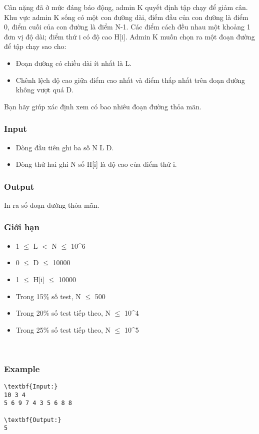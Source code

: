 

Cân nặng đã ở mức đáng báo động, admin K quyết định tập chạy để giảm cân. Khu vực admin K sống có một con đường dài, điểm đầu của con đường là điểm 0, điểm cuối của con đường là điểm N-1. Các điểm cách đều nhau một khoảng 1 đơn vị độ dài; điểm thứ i có độ cao H[i]. Admin K muốn chọn ra một đoạn đường để tập chạy sao cho:
\begin{itemize}
	\item Đoạn đường có chiều dài ít nhất là L.
	\item Chênh lệch độ cao giữa điểm cao nhất và điểm thấp nhất trên đoạn đường không vượt quá D.
\end{itemize}

Bạn hãy giúp xác định xem có bao nhiêu đoạn đường thỏa mãn.

\subsubsection{Input}
\begin{itemize}
	\item Dòng đầu tiên ghi ba số N L D.
	\item Dòng thứ hai ghi N số H[i] là độ cao của điểm thứ i.
\end{itemize}

\subsubsection{Output}

In ra số đoạn đường thỏa mãn.

\subsubsection{Giới hạn}
\begin{itemize}
	\item 1  $\le$  L $<$ N  $\le$  10\textasciicircum6
	\item 0  $\le$  D  $\le$  10000
	\item 1  $\le$  H[i]  $\le$  10000
	\item Trong 15\% số test, N  $\le$  500
	\item Trong 20\% số test tiếp theo, N  $\le$  10\textasciicircum4
	\item Trong 25\% số test tiếp theo, N  $\le$  10\textasciicircum5
\end{itemize}

 

\subsubsection{Example}
\begin{verbatim}
\textbf{Input:}
10 3 4
5 6 9 7 4 3 5 6 8 8

\textbf{Output:}
5\end{verbatim}
